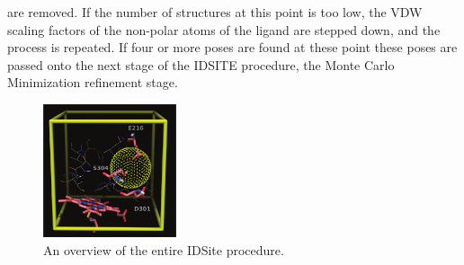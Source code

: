 are removed.
If the number of structures at this point is too low, the VDW scaling factors of the non-polar atoms of the ligand are stepped down, and the process is repeated.
If four or more poses are found at these point these poses are passed onto the next stage of the IDSITE procedure, the Monte Carlo Minimization refinement stage.

\begin{figure}[h]
\centering
\includegraphics[width=0.35\textwidth]{figures/idsite/glide.png}
\caption{An overview of the entire IDSite procedure.}
\label{fig:idsite_glide}
\end{figure}


